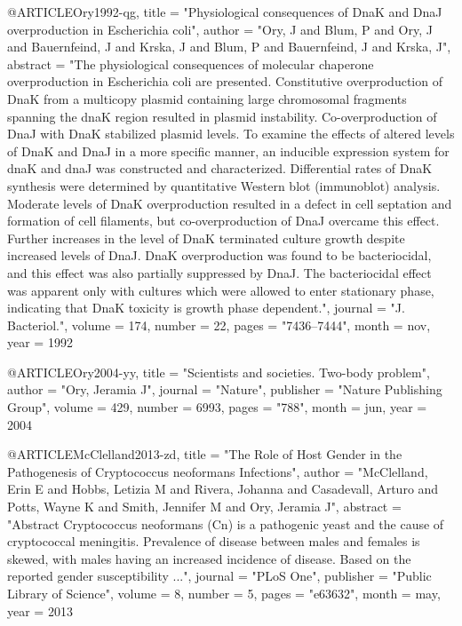 @ARTICLE{Ory1992-qg,
  title    = "Physiological consequences of {DnaK} and {DnaJ} overproduction in
              Escherichia coli",
  author   = "Ory, J and Blum, P and Ory, J and Bauernfeind, J and Krska, J and
              Blum, P and Bauernfeind, J and Krska, J",
  abstract = "The physiological consequences of molecular chaperone
              overproduction in Escherichia coli are presented. Constitutive
              overproduction of DnaK from a multicopy plasmid containing large
              chromosomal fragments spanning the dnaK region resulted in
              plasmid instability. Co-overproduction of DnaJ with DnaK
              stabilized plasmid levels. To examine the effects of altered
              levels of DnaK and DnaJ in a more specific manner, an inducible
              expression system for dnaK and dnaJ was constructed and
              characterized. Differential rates of DnaK synthesis were
              determined by quantitative Western blot (immunoblot) analysis.
              Moderate levels of DnaK overproduction resulted in a defect in
              cell septation and formation of cell filaments, but
              co-overproduction of DnaJ overcame this effect. Further increases
              in the level of DnaK terminated culture growth despite increased
              levels of DnaJ. DnaK overproduction was found to be
              bacteriocidal, and this effect was also partially suppressed by
              DnaJ. The bacteriocidal effect was apparent only with cultures
              which were allowed to enter stationary phase, indicating that
              DnaK toxicity is growth phase dependent.",
  journal  = "J. Bacteriol.",
  volume   =  174,
  number   =  22,
  pages    = "7436--7444",
  month    =  nov,
  year     =  1992
}

@ARTICLE{Ory2004-yy,
  title     = "Scientists and societies. Two-body problem",
  author    = "Ory, Jeramia J",
  journal   = "Nature",
  publisher = "Nature Publishing Group",
  volume    =  429,
  number    =  6993,
  pages     = "788",
  month     =  jun,
  year      =  2004
}

@ARTICLE{McClelland2013-zd,
  title     = "The Role of Host Gender in the Pathogenesis of Cryptococcus
               neoformans Infections",
  author    = "McClelland, Erin E and Hobbs, Letizia M and Rivera, Johanna and
               Casadevall, Arturo and Potts, Wayne K and Smith, Jennifer M and
               Ory, Jeramia J",
  abstract  = "Abstract Cryptococcus neoformans (Cn) is a pathogenic yeast and
               the cause of cryptococcal meningitis. Prevalence of disease
               between males and females is skewed, with males having an
               increased incidence of disease. Based on the reported gender
               susceptibility ...",
  journal   = "PLoS One",
  publisher = "Public Library of Science",
  volume    =  8,
  number    =  5,
  pages     = "e63632",
  month     =  may,
  year      =  2013
}

